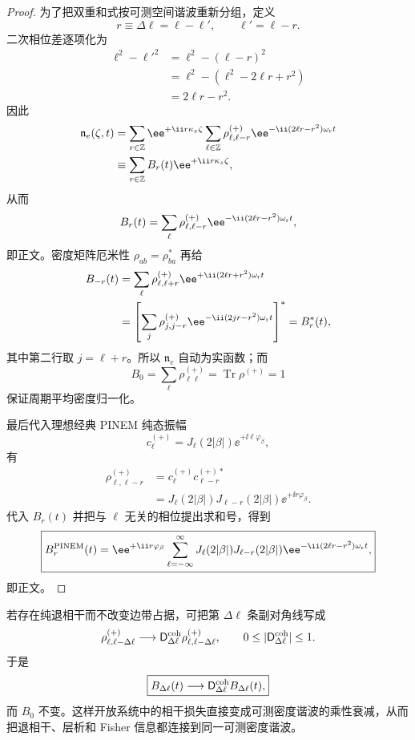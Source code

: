 \begin{proof}
为了把双重和式按可测空间谐波重新分组，定义
\[
r\equiv\Delta\ell=\ell-\ell',
\qquad
\ell'=\ell-r.
\]
二次相位差逐项化为
\begin{align*}
\ell^2-\ell'^2
&=\ell^2-(\ell-r)^2\\
&=\ell^2-(\ell^2-2\ell r+r^2)\\
&=2\ell r-r^2.
\end{align*}
因此
\begin{align*}
\mathfrak n_e(\zeta,t)
&=\sum_{r\in\mathbb Z}
\ee^{+\ii r\kappa_z\zeta}
\sum_{\ell\in\mathbb Z}
\rho_{\ell,\ell-r}^{(+)}
\ee^{-\ii(2\ell r-r^2)\omega_{\rm r}t}\\
&\equiv
\sum_{r\in\mathbb Z}B_r(t)
\ee^{+\ii r\kappa_z\zeta},
\end{align*}
从而
\[
B_r(t)
=\sum_\ell
\rho_{\ell,\ell-r}^{(+)}
\ee^{-\ii(2\ell r-r^2)\omega_{\rm r}t},
\]
即正文。密度矩阵厄米性
$\rho_{ab}=\rho_{ba}^*$ 再给
\begin{align*}
B_{-r}(t)
&=\sum_\ell
\rho_{\ell,\ell+r}^{(+)}
\ee^{+\ii(2\ell r+r^2)\omega_{\rm r}t}\\
&=\left[
\sum_j
\rho_{j,j-r}^{(+)}
\ee^{-\ii(2jr-r^2)\omega_{\rm r}t}
\right]^*
=B_r^*(t),
\end{align*}
其中第二行取 $j=\ell+r$。所以 $\mathfrak n_e$ 自动为实函数；而
\[
B_0=\sum_\ell\rho_{\ell\ell}^{(+)}
=\operatorname{Tr}\rho^{(+)}=1
\]
保证周期平均密度归一化。

最后代入理想经典 PINEM 纯态振幅
\[
c_\ell^{(+)}
=J_\ell(2|\beta|)\ee^{+\ii\ell\varphi_\beta},
\]
有
\begin{align*}
\rho_{\ell,\ell-r}^{(+)}
&=c_\ell^{(+)}c_{\ell-r}^{(+)*}\\
&=J_\ell(2|\beta|)J_{\ell-r}(2|\beta|)
\ee^{+\ii r\varphi_\beta}.
\end{align*}
代入 $B_r(t)$ 并把与 $\ell$ 无关的相位提出求和号，得到
\[
\boxed{
B_r^{\rm PINEM}(t)
=\ee^{+\ii r\varphi_\beta}
\sum_{\ell=-\infty}^{\infty}
J_\ell(2|\beta|)J_{\ell-r}(2|\beta|)
\ee^{-\ii(2\ell r-r^2)\omega_{\rm r}t},}
\]
即正文。
\end{proof}


若存在纯退相干而不改变边带占据，可把第 $\Delta\ell$ 条副对角线写成
\begin{equation*}
 \rho_{\ell,\ell-\Delta\ell}^{(+)}
 \longrightarrow
 \mathsf D_{\Delta\ell}^{\rm coh}\rho_{\ell,\ell-\Delta\ell}^{(+)},
 \qquad 0\le|\mathsf D_{\Delta\ell}^{\rm coh}|\le1.
\end{equation*}
于是
\begin{equation}
\boxed{B_{\Delta\ell}(t)\longrightarrow\mathsf D_{\Delta\ell}^{\rm coh} B_{\Delta\ell}(t),}
\label{eq:bunching_dephasing_transfer_dp46}
\end{equation}
而 $B_0$ 不变。这样开放系统中的相干损失直接变成可测密度谐波的乘性衰减，从而把退相干、层析和 Fisher 信息都连接到同一可测密度谐波。

